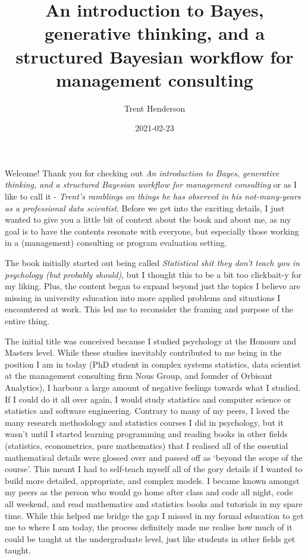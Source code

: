 \documentclass[
]{book}
\title{An introduction to Bayes, generative thinking, and a structured Bayesian workflow for management consulting}
\author{Trent Henderson}
\date{2021-02-23}
\begin{document}
\maketitle

{
\setcounter{tocdepth}{1}
\tableofcontents
}
Welcome! Thank you for checking out \emph{An introduction to Bayes, generative thinking, and a structured Bayesian workflow for management consulting} or as I like to call it - \emph{Trent's ramblings on things he has observed in his not-many-years as a professional data scientist}. Before we get into the exciting details, I just wanted to give you a little bit of context about the book and about me, as my goal is to have the contents resonate with everyone, but especially those working in a (management) consulting or program evaluation setting.

The book initially started out being called \emph{Statistical shit they don't teach you in psychology (but probably should)}, but I thought this to be a bit too clickbait-y for my liking. Plus, the content began to expand beyond just the topics I believe are missing in university education into more applied problems and situations I encountered at work. This led me to reconsider the framing and purpose of the entire thing.

The initial title was conceived because I studied psychology at the Honours and Masters level. While these studies inevitably contributed to me being in the position I am in today (PhD student in complex systems statistics, data scientist at the management consulting firm Nous Group, and founder of Orbisant Analytics), I harbour a large amount of negative feelings towards what I studied. If I could do it all over again, I would study statistics and computer science or statistics and software engineering. Contrary to many of my peers, I loved the many research methodology and statistics courses I did in psychology, but it wasn't until I started learning programming and reading books in other fields (statistics, econometrics, pure mathematics) that I realised all of the essential mathematical details were glossed over and passed off as `beyond the scope of the course'. This meant I had to self-teach myself all of the gory details if I wanted to build more detailed, appropriate, and complex models. I became known amongst my peers as the person who would go home after class and code all night, code all weekend, and read mathematics and statistics books and tutorials in my spare time. While this helped me bridge the gap I missed in my formal education to get me to where I am today, the process definitely made me realise how much of it could be taught at the undergraduate level, just like students in other fields get taught.
\end{document}
